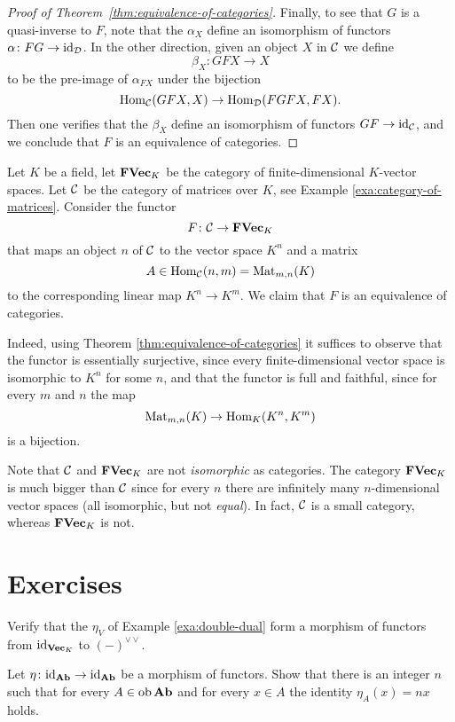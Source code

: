 \begin{proof}[Proof of Theorem~\ref{thm:equivalence-of-categories}]
Finally, to see that $G$ is a quasi-inverse to $F$, note that the $\alpha_X$ define an isomorphism of functors $\alpha\colon FG \to {\rm id}_{{\mathcal{D}}}$. In the other direction, given an object $X$ in ${\mathcal{C}}$ we define
\[
	\beta_X \colon GFX \to X
\]
to be the pre-image of $\alpha_{FX}$ under the bijection
\[
	\operatorname{Hom}_{\mathcal{C}}(GFX,X) \to \operatorname{Hom}_{\mathcal{D}}(FGFX,FX).
\]
Then one verifies that the $\beta_X$ define an isomorphism of functors $GF \to {\rm id}_{{\mathcal{C}}}$, and we conclude that $F$ is an equivalence of categories.
\end{proof}



\begin{example}
Let $K$ be a field, let $\mathbf{FVec}_K$ be the category of finite-dimensional $K$-vector spaces. Let ${\mathcal{C}}$ be the category of matrices over $K$, see Example \ref{exa:category-of-matrices}. Consider the functor
\[
	F\colon  {\mathcal{C}} \to \mathbf{FVec}_K
\]
that maps an object $n$ of ${\mathcal{C}}$ to the vector space $K^n$ and a matrix
\[
	A \in \operatorname{Hom}_{\mathcal{C}}(n,m) = \operatorname{Mat}_{m,n}(K)
\]
to the corresponding linear map $K^n \to K^m$. We claim that $F$ is an equivalence of categories.

Indeed, using Theorem \ref{thm:equivalence-of-categories} it suffices to observe that the functor is essentially surjective, since every finite-dimensional vector space is isomorphic to $K^n$ for some $n$, and that the functor is full and faithful, since for every $m$ and $n$ the map
\[
	\operatorname{Mat}_{m,n}(K) \to \operatorname{Hom}_K(K^n,K^m)
\]
is a bijection.

Note that ${\mathcal{C}}$ and $\mathbf{FVec}_K$ are not \emph{isomorphic} as categories. The category $\mathbf{FVec}_K$ is much bigger than ${\mathcal{C}}$ since for every $n$ there are infinitely many $n$-dimensional vector spaces (all isomorphic, but not \emph{equal}). In fact, ${\mathcal{C}}$ is a small category, whereas $\mathbf{FVec}_K$ is not.
\end{example}



\newpage
\section*{Exercises}


\begin{exercise}\label{exc:double-dual}
Verify that the $\eta_V$ of Example \ref{exa:double-dual} form a morphism of
functors from ${\rm id}_{\operatorname{{\bf{Vec}}}_K}$ to $(-)^{\vee\vee}$.
\end{exercise}

\begin{exercise}\label{exc:endo-identity-ab}
Let $\eta \colon {\rm id}_{\mathbf{Ab}} \to {\rm id}_{\mathbf{Ab}}$ be a morphism of functors. Show that there is an integer $n$ such that  for every $A \in \operatorname{ob} \mathbf{Ab}$ and for every $x \in A$ the identity $\eta_A(x) =nx$ holds.
\end{exercise}



